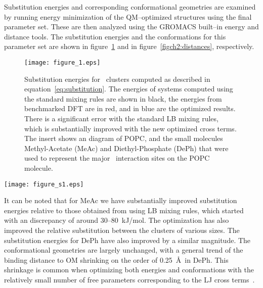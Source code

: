 Substitution energies and corresponding conformational geometries are examined by running energy
minimization of the QM--optimized structures using the final parameter set. 
These are then analyzed using the GROMACS built--in energy and distance tools. 
The substitution energies and the conformations for
this parameter set are shown in figure~\ref{figch2:energies} 
and in figure~\ref{figch2:distances}, respectively. 
\begin{figure}[h!tb]
    \texttt{[image: figure\_1.eps]}
    \caption[Substitution energies for \na~clusters]{Substitution energies for \na~clusters computed as described
in equation~\ref{eq:substitution}. 
The energies of systems computed using the standard 
mixing rules are shown in black, the energies from benchmarked DFT are in red, 
and in blue are the optimized results. 
There is a significant
error with the standard LB mixing rules, which is substantially improved with the new optimized cross terms. 
The insert shows an diagram of POPC, and
the small molecules Methyl-Acetate (MeAc) and Diethyl-Phosphate (DePh) 
that were used to represent the major \na~interaction sites on the POPC molecule.}
    \label{figch2:energies}
\end{figure}
\begin{sidewaysfigure}[h!tb]
    \centering
    \caption[Distances from \na to each component atom in sample clusters]{Distances from \na to each component atom in sample clusters. We compute the geometry of our sample clusters by computing the distance from
    the ion to each other atom in the system, shown per atom type.
    These distances are used in combination with the substitution energies in figure 2 to compute the
error for the NM optimization.}
    \label{figch2:distances}
    \texttt{[image: figure\_s1.eps]}
\end{sidewaysfigure}
It can be noted that for MeAc we have substantially improved substitution
energies relative to those obtained from using LB mixing rules, 
which started with an discrepancy of around 30--80~kJ/mol. The optimization has also
improved the relative substitution between the clusters of various sizes. 
The substitution energies for DePh have also improved by a similar magnitude. 
The conformational geometries are largely unchanged, 
with a general trend of the binding distance to OM\* shrinking on the order of 0.25~\AA~in DePh. 
This shrinkage is common when optimizing both energies and conformations
with the relatively small number of free parameters corresponding to
the LJ cross terms~\cite{wineman:2019}.


